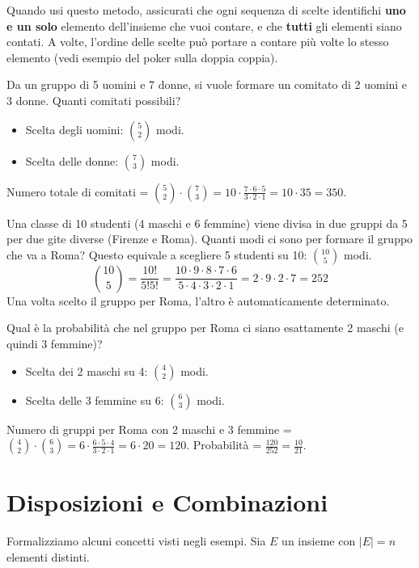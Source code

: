 \begin{remark}
Quando usi questo metodo, assicurati che ogni sequenza di scelte identifichi \textbf{uno e un solo} elemento dell'insieme che vuoi contare, e che \textbf{tutti} gli elementi siano contati.
A volte, l'ordine delle scelte può portare a contare più volte lo stesso elemento (vedi esempio del poker sulla doppia coppia).
\end{remark}

\begin{example}
Da un gruppo di 5 uomini e 7 donne, si vuole formare un comitato di 2 uomini e 3 donne. Quanti comitati possibili?
\begin{itemize}
    \item Scelta degli uomini: $\binom{5}{2}$ modi.
    \item Scelta delle donne: $\binom{7}{3}$ modi.
\end{itemize}
Numero totale di comitati = $\binom{5}{2} \cdot \binom{7}{3} = 10 \cdot \frac{7 \cdot 6 \cdot 5}{3 \cdot 2 \cdot 1} = 10 \cdot 35 = 350$.
\end{example}

\begin{example}
Una classe di 10 studenti (4 maschi e 6 femmine) viene divisa in due gruppi da 5 per due gite diverse (Firenze e Roma). Quanti modi ci sono per formare il gruppo che va a Roma?
Questo equivale a scegliere 5 studenti su 10: $\binom{10}{5}$ modi.
$$ \binom{10}{5} = \frac{10!}{5!5!} = \frac{10 \cdot 9 \cdot 8 \cdot 7 \cdot 6}{5 \cdot 4 \cdot 3 \cdot 2 \cdot 1} = 2 \cdot 9 \cdot 2 \cdot 7 = 252 $$
Una volta scelto il gruppo per Roma, l'altro è automaticamente determinato.

Qual è la probabilità che nel gruppo per Roma ci siano esattamente 2 maschi (e quindi 3 femmine)?
\begin{itemize}
    \item Scelta dei 2 maschi su 4: $\binom{4}{2}$ modi.
    \item Scelta delle 3 femmine su 6: $\binom{6}{3}$ modi.
\end{itemize}
Numero di gruppi per Roma con 2 maschi e 3 femmine = $\binom{4}{2} \cdot \binom{6}{3} = 6 \cdot \frac{6 \cdot 5 \cdot 4}{3 \cdot 2 \cdot 1} = 6 \cdot 20 = 120$.
Probabilità = $\frac{120}{252} = \frac{10}{21}$.
\end{example}

\section{Disposizioni e Combinazioni}
Formalizziamo alcuni concetti visti negli esempi. Sia $E$ un insieme con $|E|=n$ elementi distinti.

